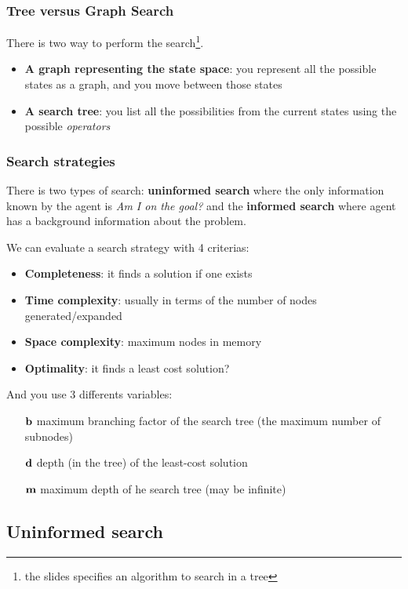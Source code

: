 \subsubsection{Tree versus Graph Search}

There is two way to perform the search\footnote{the slides specifies an algorithm to search in a tree}.
\begin{itemize}
\item \textbf{A graph representing the state space}: you represent all the possible states as a graph, and you move between those states
\item \textbf{A search tree}: you list all the possibilities from the current states using the possible \textit{operators}
\end{itemize}


\subsubsection{Search strategies}
There is two types of search: \textbf{uninformed search} where the only information known by the agent is \textit{Am I on the goal?} and the \textbf{informed search} where agent has a background information about the problem.

We can evaluate a search strategy with 4 criterias:
\begin{itemize}
\item \textbf{Completeness}: it finds a solution if one exists
\item \textbf{Time complexity}: usually in terms of the number of nodes generated/expanded
\item \textbf{Space complexity}: maximum nodes in memory
\item \textbf{Optimality}: it finds a least cost solution?
\end{itemize}
And you use 3 differents variables:
\begin{itemize}
\item[$\textbf b$] maximum branching factor of the search tree (the maximum number of subnodes)
\item[$\textbf d$] depth (in the tree) of the least-cost solution
\item[$\textbf m$] maximum depth of he search tree (may be infinite)
\end{itemize}

\subsection{Uninformed search}

